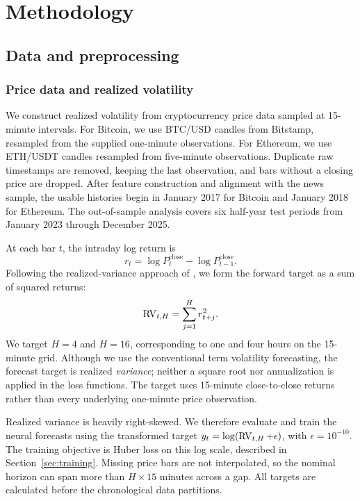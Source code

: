 \section{Methodology}\label{sec:methodology}
\subsection{Data and preprocessing}\label{sec:data}
\subsubsection{Price data and realized volatility}
We construct realized volatility from cryptocurrency price data sampled at
15-minute intervals. For Bitcoin, we use BTC/USD candles from Bitstamp,
resampled from the supplied one-minute observations. For Ethereum, we use
ETH/USDT candles resampled from five-minute observations. Duplicate raw
timestamps are removed, keeping the last observation, and bars without a
closing price are dropped. After feature construction and alignment with
the news sample, the usable histories begin in January 2017 for Bitcoin
and January 2018 for Ethereum. The out-of-sample analysis covers six
half-year test periods from January 2023 through December 2025.

At each bar $t$, the intraday log return is
\begin{equation}
 r_t=\log P_t^{\mathrm{close}}-\log P_{t-1}^{\mathrm{close}}.
\end{equation}
Following the realized-variance approach of \citet{Andersen2003}, we form
the forward target as a sum of squared returns:
\begin{equation}
 \operatorname{RV}_{t,H}=\sum_{j=1}^{H}r_{t+j}^{2}.\label{eq:rv}
\end{equation}
We target $H=4$ and $H=16$, corresponding to one and four hours on the
15-minute grid. Although we use the conventional term volatility
forecasting, the forecast target is realized \emph{variance}; neither a
square root nor annualization is applied in the loss functions. The
target uses 15-minute close-to-close returns rather than every underlying
one-minute price observation.

Realized variance is heavily right-skewed. We therefore evaluate and train
the neural forecasts using the transformed target
$y_t=\log(\operatorname{RV}_{t,H}+\epsilon)$, with $\epsilon=10^{-10}$. The training
objective is Huber loss on this log scale, described in
Section~\ref{sec:training}. Missing price bars are not interpolated, so
the nominal horizon can span more than $H\times15$ minutes across a gap.
All targets are calculated before the chronological data partitions.

